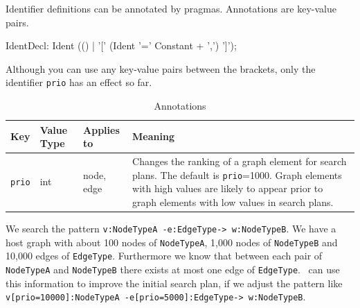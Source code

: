 Identifier definitions can be annotated by pragmas. Annotations are key-value pairs.
\begin{rail}
  IdentDecl: Ident (() | '[' (Ident '=' Constant + ',') ']');
\end{rail}
Although you can use any key-value pairs between the brackets, only the identifier \texttt{prio} has an effect so far.
\begin{table}[htbp]
\begin{tabularx}{\linewidth}{|lllX|} \hline
  \textbf{Key} & \textbf{Value Type} & \textbf{Applies to} & \textbf{Meaning} \\ \hline
  \texttt{prio} & int & node, edge & Changes the ranking of a graph element for search plans. The default is \texttt{prio}=1000. Graph elements with high values are likely to appear prior to graph elements with low values in search plans.\\ \hline
\end{tabularx}
\caption{Annotations}
\label{tabannotations}
\end{table}
\begin{example}
We search the pattern \texttt{v:NodeTypeA -e:EdgeType-> w:NodeTypeB}. We have a host graph with about 100 nodes of \texttt{NodeTypeA}, 1,000 nodes of \texttt{NodeTypeB} and 10,000 edges of \texttt{EdgeType}. Furthermore we know that between each pair of \texttt{NodeTypeA} and \texttt{NodeTypeB} there exists at most one edge of \texttt{EdgeType}. \GrG\ can use this information to improve the initial search plan, if we adjust the pattern like \texttt{v[prio=10000]:NodeTypeA -e[prio=5000]:EdgeType-> w:NodeTypeB}.
\end{example}
